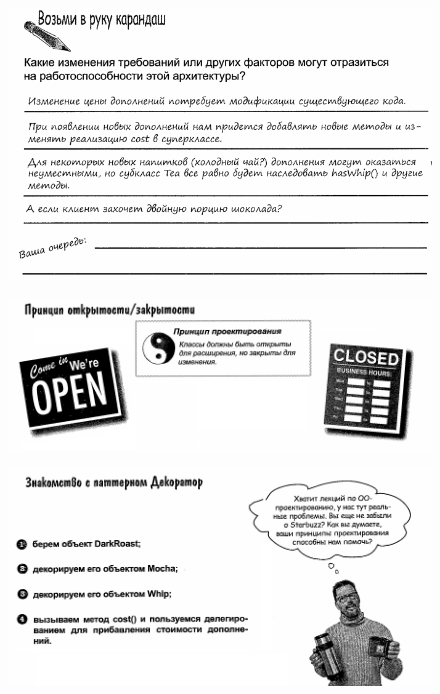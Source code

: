 \documentclass{beamer}
\begin{document}
\begin{frame}
\begin{figure}[h]
\centering
\includegraphics[scale=0.5]{images/lec10-pic09.png}
\label{pic-sort}
\end{figure}
\end{frame}

\begin{frame}
\begin{figure}[h]
\centering
\includegraphics[scale=0.5]{images/lec10-pic10.png}
\label{pic-sort}
\end{figure}
\end{frame}

\begin{frame}
\begin{figure}[h]
\centering
\includegraphics[scale=0.5]{images/lec10-pic11.png}
\label{pic-sort}
\end{figure}
\end{frame}
\end{document}
